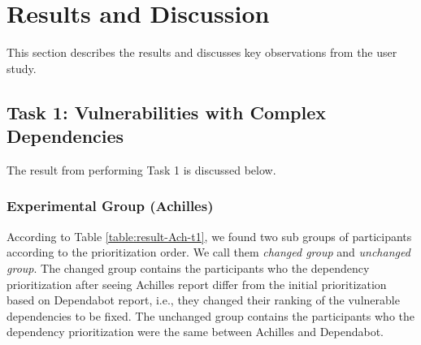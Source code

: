 \documentclass[conference]{IEEEtran}
\begin{document}
	
	
	\section{Results and Discussion}
	This section describes the results and discusses key observations from the user study.
	
	\subsection{Task 1: Vulnerabilities with Complex Dependencies}
	
	The result from performing Task 1 is discussed below.
	
	\subsubsection{Experimental Group (Achilles)}
	According to Table \ref{table:result-Ach-t1}, we found two sub groups of participants according to the prioritization order. We call them \textit{changed group} and \textit{unchanged group}. The changed group contains the participants who the dependency prioritization after seeing Achilles report differ from the  initial prioritization based on Dependabot report, i.e., they changed their ranking of the vulnerable dependencies to be fixed. The unchanged group contains the participants who the dependency prioritization were the same between Achilles and Dependabot.
	
\end{document}
